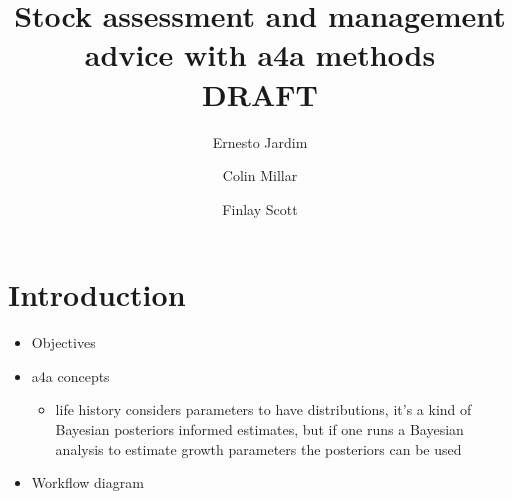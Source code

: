 \documentclass[a4paper,english,10pt]{article}\usepackage[]{graphicx}\usepackage[]{color}
\begin{document}

\title{Stock assessment and management advice with a4a methods \\ DRAFT}

\author[1]{Ernesto Jardim}
\author[1]{Colin Millar}
\author[1]{Finlay Scott}

\maketitle
\tableofcontents
\newpage

\section{Introduction}

\begin{itemize}
	\item Objectives
	\item a4a concepts
	\begin{itemize}
		\item life history considers parameters to have distributions, it's a kind of Bayesian posteriors informed estimates, but if one runs a Bayesian analysis to estimate growth parameters the posteriors can be used  
	\end{itemize}
	\item Workflow diagram
\end{itemize}
\end{document}
